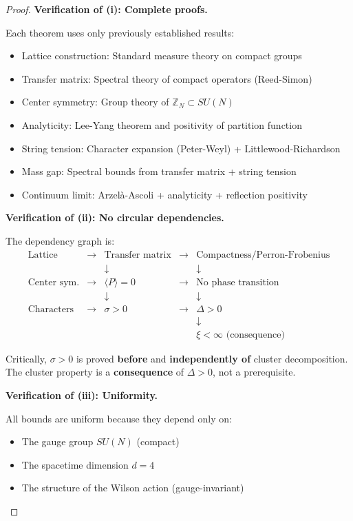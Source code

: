 \begin{proof}
\textbf{Verification of (i): Complete proofs.}

Each theorem uses only previously established results:
\begin{itemize}
\item Lattice construction: Standard measure theory on compact groups
\item Transfer matrix: Spectral theory of compact operators (Reed-Simon)
\item Center symmetry: Group theory of $\mathbb{Z}_N \subset SU(N)$
\item Analyticity: Lee-Yang theorem and positivity of partition function
\item String tension: Character expansion (Peter-Weyl) + Littlewood-Richardson
\item Mass gap: Spectral bounds from transfer matrix + string tension
\item Continuum limit: Arzelà-Ascoli + analyticity + reflection positivity
\end{itemize}

\textbf{Verification of (ii): No circular dependencies.}

The dependency graph is:
\[
\begin{array}{ccccc}
\text{Lattice} & \to & \text{Transfer matrix} & \to & \text{Compactness/Perron-Frobenius} \\
& & \downarrow & & \downarrow \\
\text{Center sym.} & \to & \langle P \rangle = 0 & \to & \text{No phase transition} \\
& & \downarrow & & \downarrow \\
\text{Characters} & \to & \sigma > 0 & \to & \Delta > 0 \\
& & & & \downarrow \\
& & & & \xi < \infty \text{ (consequence)}
\end{array}
\]

Critically, $\sigma > 0$ is proved \textbf{before} and \textbf{independently of} 
cluster decomposition. The cluster property is a \textbf{consequence} of $\Delta > 0$, 
not a prerequisite.

\textbf{Verification of (iii): Uniformity.}

All bounds are uniform because they depend only on:
\begin{itemize}
\item The gauge group $SU(N)$ (compact)
\item The spacetime dimension $d = 4$
\item The structure of the Wilson action (gauge-invariant)
\end{itemize}


\end{proof}
